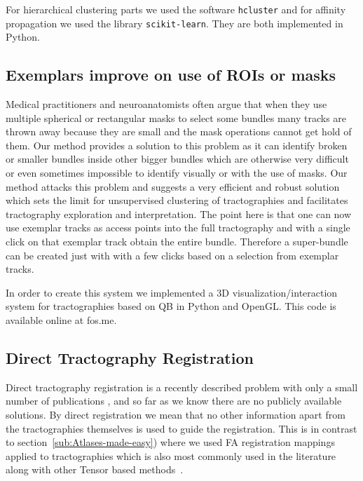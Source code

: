 \documentclass[preprint,authoryear,a4paper,10pt,onecolumn]{elsarticle}
\begin{document}
For hierarchical clustering parts we used the software \texttt{hcluster}
and for affinity propagation we used the library
\texttt{scikit-learn}. They are both implemented in Python.

\subsection{Exemplars improve on use of ROIs or masks}

Medical practitioners and neuroanatomists often argue that when they use
multiple spherical or rectangular masks to select some bundles many
tracks are thrown away because they are small and the mask operations
cannot get hold of them. Our method provides a solution to this problem
as it can identify broken or smaller bundles inside other bigger bundles
which are otherwise very difficult or even sometimes impossible to
identify visually or with the use of masks. Our method attacks this
problem and suggests a very efficient and robust solution which sets the
limit for unsupervised clustering of tractographies and facilitates
tractography exploration and interpretation. The point here is that one
can now use exemplar tracks as access points into the full tractography
and with a single click on that exemplar track obtain the entire bundle.
Therefore a super-bundle can be created just with with a few clicks
based on a selection from exemplar tracks.

In order to create this system we implemented a 3D
visualization/interaction system for tractographies based on QB in
Python and OpenGL. This code is available online at fos.me.


\subsection{Direct Tractography Registration}

Direct tractography registration is a recently described problem with
only a small number of publications \citep{leemans2006multiscale,
  mayer2008bundles, mayerdirect, mayer2011supervised,
  durrleman2010registration, zvitia2008adaptive, Zvitia2010,
  ZiyanMICCAI07}, and so far as we know there are no publicly available
solutions. By direct registration we mean that no other information
apart from the tractographies themselves is used to guide the
registration. This is in contrast to
section~\ref{sub:Atlases-made-easy}) where we used FA registration
mappings applied to tractographies which is also most commonly used in
the literature along with other Tensor based
methods~\citep{goh2006algebraic}.
\end{document}
